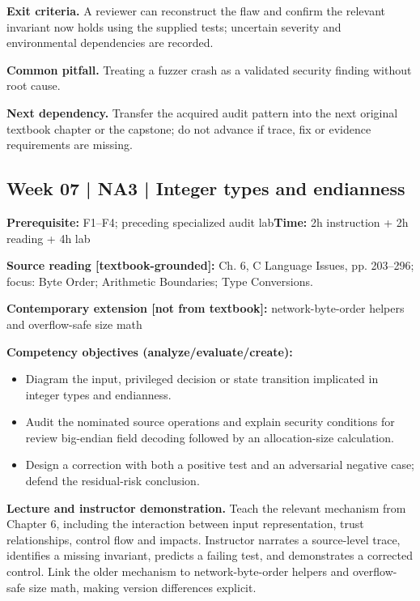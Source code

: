 \documentclass[10pt,letterpaper]{article}
\begin{document}
\textbf{Exit criteria.} A reviewer can reconstruct the flaw and confirm the relevant invariant now holds using the supplied tests; uncertain severity and environmental dependencies are recorded.

\textbf{Common pitfall.} Treating a fuzzer crash as a validated security finding without root cause.

\textbf{Next dependency.} Transfer the acquired audit pattern into the next original textbook chapter or the capstone; do not advance if trace, fix or evidence requirements are missing.

\subsection{Week 07 | NA3 | Integer types and endianness}
\textbf{Prerequisite:} F1--F4; preceding specialized audit lab\hfill\textbf{Time:} 2h instruction + 2h reading + 4h lab

\textbf{Source reading [textbook-grounded]:} Ch. 6, C Language Issues, pp. 203--296; focus: Byte Order; Arithmetic Boundaries; Type Conversions.

\textbf{Contemporary extension [not from textbook]:} network-byte-order helpers and overflow-safe size math

\textbf{Competency objectives (analyze/evaluate/create):}
\begin{itemize}[leftmargin=*,itemsep=2pt]
\item Diagram the input, privileged decision or state transition implicated in integer types and endianness.
\item Audit the nominated source operations and explain security conditions for review big-endian field decoding followed by an allocation-size calculation.
\item Design a correction with both a positive test and an adversarial negative case; defend the residual-risk conclusion.
\end{itemize}
\textbf{Lecture and instructor demonstration.} Teach the relevant mechanism from Chapter 6, including the interaction between input representation, trust relationships, control flow and impacts. Instructor narrates a source-level trace, identifies a missing invariant, predicts a failing test, and demonstrates a corrected control. Link the older mechanism to network-byte-order helpers and overflow-safe size math, making version differences explicit.
\end{document}
